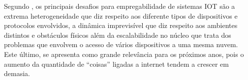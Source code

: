 Segundo , os principais desafios para empregabilidade de sistemas IOT são a extrema heterogeneidade que diz respeito aos diferente tipos de dispositivos e protocolos envolvidos, a dinâmica imprevisível que diz respeito aos ambientes distintos e obstáculos físicos além da escalabilidade no núcleo que trata dos problemas que envolvem o acesso de vários dispositivos a uma mesma nuvem. Este último, se apresenta como grande relevância para os próximos anos, pois o aumento da quantidade de ``coisas'' ligadas a internet tendem a crescer em demasia.










